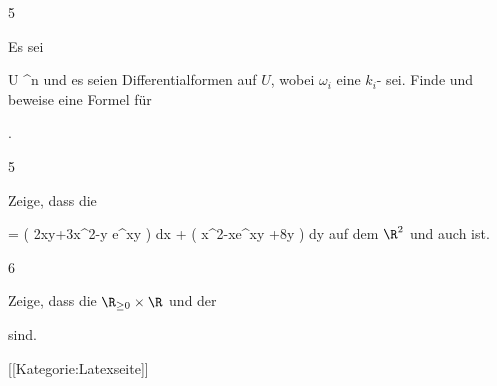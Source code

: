 {5}
{

Es sei

\mavergleichskette
{\vergleichskette
{ U
}
{ \subseteq }{ \R^n
}
{  }{
}
{    }{
}
{   }{
}
}
{}{}{}
und es seien
 Differentialformen auf $U$, wobei $\omega_i$ eine
$k_i$-
sei. Finde und beweise eine Formel für

 { . }

}
{} {}

{5}
{

Zeige, dass die

\mavergleichskettedisp
{\vergleichskette
{ \omega
}
{ =} { \left(  2xy+3x^2-y e^{xy}  \right) dx + \left(  x^2-xe^{xy} +8y  \right)  dy
}
{ } {
}
{ } {
}
{ } {
}
}
{}{}{}
auf dem $\R^2$
und auch
ist.

}
{} {}

{6}
{

Zeige, dass die
$\R_{\geq 0} \times \R$ und der

sind.

}
{} {}

 [[Kategorie:Latexseite]]
